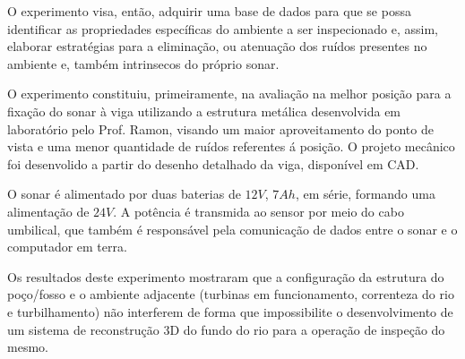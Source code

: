 O experimento visa, então, adquirir uma base de
dados para que se possa identificar as propriedades específicas do ambiente a ser inspecionado e, assim, 
elaborar estratégias para a eliminação, ou atenuação dos ruídos presentes no
ambiente e, também intrinsecos do próprio sonar.

O experimento constituiu, primeiramente, na avaliação na melhor posição
para a fixação do sonar à viga utilizando a estrutura metálica desenvolvida em
laboratório pelo Prof. Ramon, visando um maior aproveitamento do ponto de vista
e uma menor quantidade de ruídos referentes á posição. O projeto mecânico foi
desenvolido a partir do desenho detalhado da viga, disponível em CAD.

O sonar é alimentado por duas baterias de $12V$, $7Ah$, em série, formando uma
alimentação de $24V$. A potência é transmida ao sensor por meio do cabo
umbilical, que também é responsável pela comunicação de dados entre o sonar e o
computador em terra.

Os resultados deste experimento mostraram que a configuração da estrutura do
poço/fosso e o ambiente adjacente (turbinas em funcionamento, correnteza do rio
e turbilhamento) não interferem de forma que impossibilite o desenvolvimento de
um sistema de reconstrução 3D do fundo do rio para a operação de inspeção do
mesmo.
